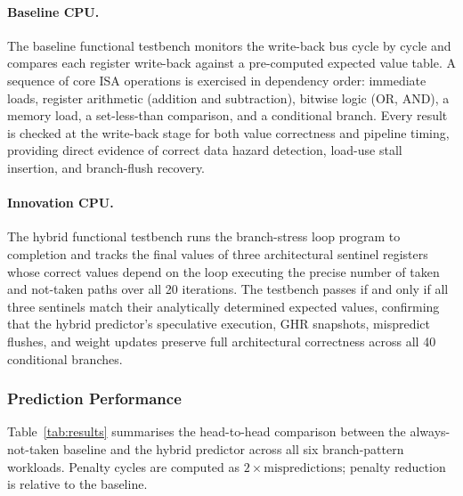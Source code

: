 \documentclass[12pt,a4paper]{article}
\begin{document}
\paragraph{Baseline CPU.}
The baseline functional testbench monitors the write-back bus cycle by cycle and
compares each register write-back against a pre-computed expected value table.
A sequence of core ISA operations is exercised in dependency order: immediate
loads, register arithmetic (addition and subtraction), bitwise logic (OR, AND),
a memory load, a set-less-than comparison, and a conditional branch.
Every result is checked at the write-back stage for both value correctness and
pipeline timing, providing direct evidence of correct data hazard detection,
load-use stall insertion, and branch-flush recovery.

\paragraph{Innovation CPU.}
The hybrid functional testbench runs the branch-stress loop program to completion
and tracks the final values of three architectural sentinel registers whose
correct values depend on the loop executing the precise number of taken and
not-taken paths over all 20 iterations. The testbench passes if and only if all
three sentinels match their analytically determined expected values, confirming
that the hybrid predictor's speculative execution, GHR snapshots, mispredict
flushes, and weight updates preserve full architectural correctness across all
40 conditional branches.

\subsubsection{Prediction Performance}

Table~\ref{tab:results} summarises the head-to-head comparison between the
always-not-taken baseline and the hybrid predictor across all six
branch-pattern workloads.
Penalty cycles are computed as $2\times\text{mispredictions}$; penalty
reduction is relative to the baseline.
\end{document}
